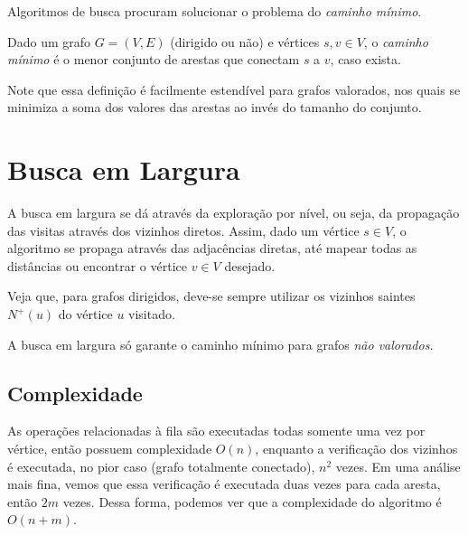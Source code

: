 
Algoritmos de busca procuram solucionar o problema do \emph{caminho mínimo}.

\begin{definition}
    Dado um grafo $G=\left( V,E \right)$ (dirigido ou não) e vértices $s, v \in V$, o \emph{caminho mínimo} é o menor conjunto de arestas que conectam $s$ a $v$, caso exista.
\end{definition}

Note que essa definição é facilmente estendível para grafos valorados, nos quais se minimiza a soma dos valores das arestas ao invés do tamanho do conjunto.

\section*{Busca em Largura}

A busca em largura se dá através da exploração por nível, ou seja, da propagação das visitas através dos vizinhos diretos. Assim, dado um vértice $s\in V$, o algoritmo se propaga através das adjacências diretas, até mapear todas as distâncias ou encontrar o vértice $v \in V$ desejado.

Veja que, para grafos dirigidos, deve-se sempre utilizar os vizinhos saintes $N^{+}\left( u \right) $ do vértice $u$ visitado.

A busca em largura só garante o caminho mínimo para grafos \emph{não valorados}.

\subsection*{Complexidade}

As operações relacionadas à fila são executadas todas somente uma vez por vértice, então possuem complexidade $O\left( n \right) $, enquanto a verificação dos vizinhos é executada, no pior caso (grafo totalmente conectado), $n^2$ vezes. Em uma análise mais fina, vemos que essa verificação é executada duas vezes para cada aresta, então $2m$ vezes. Dessa forma, podemos ver que a complexidade do algoritmo é $O\left( n+m \right) $.

